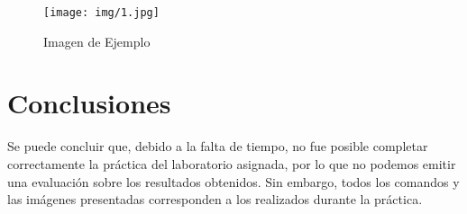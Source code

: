    \begin{figure}[H]
        \centering
        \texttt{[image: img/1.jpg]}
        \caption{Imagen de Ejemplo}
        \label{fig:Imagen_Ejemplo1}
    \end{figure}

\section{Conclusiones}
Se puede concluir que, debido a la falta de tiempo, no fue posible completar correctamente la práctica del laboratorio asignada, por lo que no podemos emitir una evaluación sobre los resultados obtenidos. Sin embargo, todos los comandos y las imágenes presentadas corresponden a los realizados durante la práctica.

